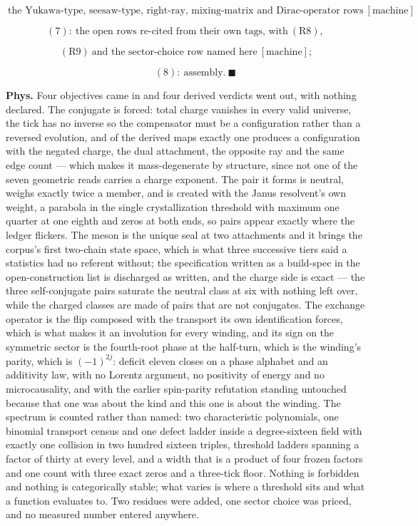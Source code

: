 \documentclass[11pt,openany]{report}
\theoremstyle{canonplain}
\theoremstyle{canondef}
\begin{document}
\[
\ \text{the Yukawa-type, seesaw-type, right-ray, mixing-matrix and Dirac-operator rows}\ [\text{machine}]
\]

\[
(7):\  \text{the open rows re-cited from their own tags, with}\ (\mathrm{R8}),
\]

\[
\ (\mathrm{R9})\ \text{and the sector-choice row named here}\ [\text{machine}];
\]

\[
\qquad (8):\  \text{assembly}.\ \blacksquare
\]

\textbf{Phys.} Four objectives came in and four derived verdicts went out, with nothing declared. The conjugate is forced: total charge vanishes in every valid universe, the tick has no inverse so the compensator must be a configuration rather than a reversed evolution, and of the derived maps exactly one produces a configuration with the negated charge, the dual attachment, the opposite ray and the same edge count — which makes it mass-degenerate by structure, since not one of the seven geometric reads carries a charge exponent. The pair it forms is neutral, weighs exactly twice a member, and is created with the Janus resolvent's own weight, a parabola in the single crystallization threshold with maximum one quarter at one eighth and zeros at both ends, so pairs appear exactly where the ledger flickers. The meson is the unique seal at two attachments and it brings the corpus's first two-chain state space, which is what three successive tiers said a statistics had no referent without; the specification written as a build-spec in the open-construction list is discharged as written, and the charge side is exact — the three self-conjugate pairs saturate the neutral class at six with nothing left over, while the charged classes are made of pairs that are not conjugates. The exchange operator is the flip composed with the transport its own identification forces, which is what makes it an involution for every winding, and its sign on the symmetric sector is the fourth-root phase at the half-turn, which is the winding's parity, which is $(-1)^{2j}$: deficit eleven closes on a phase alphabet and an additivity law, with no Lorentz argument, no positivity of energy and no microcausality, and with the earlier spin-parity refutation standing untouched because that one was about the kind and this one is about the winding. The spectrum is counted rather than named: two characteristic polynomials, one binomial transport census and one defect ladder inside a degree-sixteen field with exactly one collision in two hundred sixteen triples, threshold ladders spanning a factor of thirty at every level, and a width that is a product of four frozen factors and one count with three exact zeros and a three-tick floor. Nothing is forbidden and nothing is categorically stable; what varies is where a threshold sits and what a function evaluates to. Two residues were added, one sector choice was priced, and no measured number entered anywhere.
\end{document}
